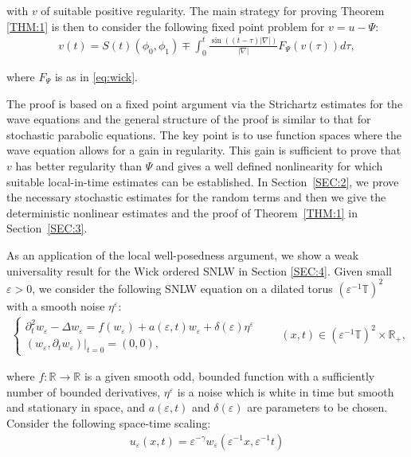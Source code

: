 \documentclass[letterpaper, 11pt,  reqno]{amsart}
\newcommand{\1}{\hspace{0.5mm}\text{I}\hspace{0.5mm}}
\newcommand{\noi}{\noindent}
\newcommand{\R}{\mathbb{R}}
\newcommand{\T}{\mathbb{T}}
\newcommand{\Dl}{\Delta}
\newcommand{\eps}{\varepsilon}
\newcommand{\g}{\gamma}
\newcommand{\dt}{\partial_t}
\numberwithin{equation}{section}
\numberwithin{theorem}{section}
\begin{document}
\noi
 with $v$ of suitable positive regularity. 
The main strategy for proving  Theorem \ref{THM:1} 
is then to consider the following fixed point problem for $v = u  - \Psi$:
\begin{align}
v(t)= 
S(t) (\phi_0, \phi_1)
 \mp \int_{0}^t  \frac{\sin ((t-\tau)|\nabla|)}{|\nabla|}  F_\Psi(v(\tau)) d\tau,
\label{SNLW9}
\end{align}

\noi
where $F_\Psi$ is as in \eqref{eq:wick}.

The proof is based on a fixed point argument via the Strichartz estimates
for the wave equations and  the general structure of the proof is similar to that 
for stochastic parabolic equations. The key point is to use function spaces
where the wave equation allows for a gain in regularity. 
This gain is sufficient to prove that $v$ has better regularity than $\Psi$ and gives a
well defined nonlinearity for which suitable local-in-time estimates can be established.  
In Section~\ref{SEC:2},  we prove the necessary
stochastic estimates for the random terms and then we give the
deterministic nonlinear estimates and the proof of
Theorem~\ref{THM:1} in Section~\ref{SEC:3}.



As an application of the local well-posedness argument, 
we  show a weak universality result for the Wick ordered SNLW
in Section \ref{SEC:4}.
Given small $\eps > 0$, we consider the following  SNLW equation 
on a dilated torus $(\eps^{- 1} \T)^2$ 
with a smooth noise $\eta^\eps$:
\begin{align*}
\begin{cases}
 \dt^2 w_\eps - \Dl w_\eps = f (w_\eps) + a (\eps, t) w_\eps + \delta   (\eps) \eta^\eps \\
 (w_\eps, \dt w_\eps) |_{t = 0} = (0, 0),
\end{cases}
\qquad 
(x, t)\in (\eps^{- 1} \T)^2 \times \R_+, 
\end{align*}


\noi
where $f: \R \to \R$ is a given smooth odd, bounded function
with a sufficiently number of bounded derivatives,
 $\eta^\eps$ is a noise which is white in time but
smooth and stationary in space,
and $a (\eps, t)$ and $\delta(\eps)$ are parameters to be chosen.
Consider the following space-time scaling:
\begin{align*}
u_{\eps} (x, t) = \eps^{- \g} w_\eps (\eps^{-1} x, \eps^{-1} t)
\end{align*}
\end{document}
